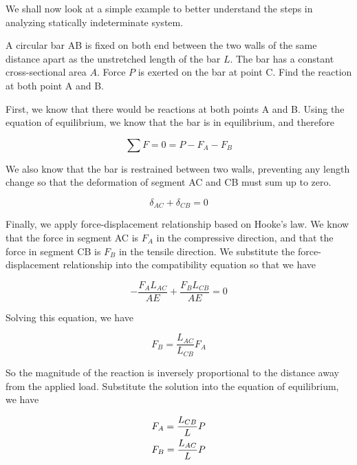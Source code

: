 \documentclass[
10pt,
a4paper,
openany,
svgnames,
]{book} %
\begin{document}
We shall now look at a simple example to better understand the steps in analyzing statically indeterminate system.

\begin{example}
  A circular bar AB is fixed on both end between the two walls of the same distance apart as the unstretched length of the bar $L$. The bar has a constant cross-sectional area $A$. Force $P$ is exerted on the bar at point C. Find the reaction at both point A and B.
  \centering
\end{example}
\begin{solution}
First, we know that there would be reactions at both points A and B. Using the equation of equilibrium, we know that the bar is in equilibrium, and therefore

\[\sum F  = 0 = P - {F_A} - {F_B}\]

We also know that the bar is restrained between two walls, preventing any length change so that the deformation of segment AC and CB must sum up to zero.

\[{\delta _{AC}} + {\delta _{CB}} = 0\]

Finally, we apply force-displacement relationship based on Hooke’s law. We know that the force in segment AC is $F_A$ in the compressive direction, and that the force in segment CB is $F_B$ in the tensile direction. We substitute the force-displacement relationship into the compatibility equation so that we have

\[ - \frac{{{F_A}{L_{AC}}}}{{AE}} + \frac{{{F_B}{L_{CB}}}}{{AE}} = 0\]	

Solving this equation, we have

\[{F_B} = \frac{{{L_{AC}}}}{{{L_{CB}}}}{F_A}\]	

So the magnitude of the reaction is inversely proportional to the distance away from the applied load. Substitute the solution into the equation of equilibrium, we have

\[\begin{gathered}
  {F_A} = \frac{{{L_{CB}}}}{L}P \hfill \\
  {F_B} = \frac{{{L_{AC}}}}{L}P \hfill \\ 
\end{gathered} \]
\end{solution}
\end{document}
